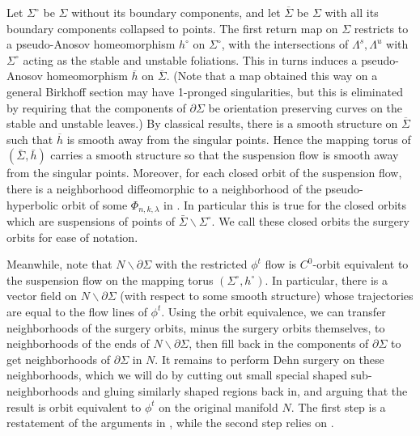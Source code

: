 \documentclass[12pt]{amsart}
\theoremstyle{definition}
\numberwithin{equation}{section}
\begin{document}
Let $\Sigma^\circ$ be $\Sigma$ without its boundary components, and let $\overline{\Sigma}$ be $\Sigma$ with all its boundary components collapsed to points. The first return map on $\Sigma$ restricts to a pseudo-Anosov homeomorphism $h^\circ$ on $\Sigma^\circ$, with the intersections of $\Lambda^s, \Lambda^u$ with $\Sigma^\circ$ acting as the stable and unstable foliations. This in turns induces a pseudo-Anosov homeomorphism $\overline{h}$ on $\overline{\Sigma}$. (Note that a map obtained this way on a general Birkhoff section may have 1-pronged singularities, but this is eliminated by requiring that the components of $\partial \Sigma$ be orientation preserving curves on the stable and unstable leaves.) By classical results, there is a smooth structure on $\overline{\Sigma}$ such that $\overline{h}$ is smooth away from the singular points. Hence the mapping torus of $(\bar{\Sigma}, \bar{h})$ carries a smooth structure so that the suspension flow is smooth away from the singular points. Moreover, for each closed orbit of the suspension flow, there is a neighborhood diffeomorphic to a neighborhood of the pseudo-hyperbolic orbit of some $\Phi_{n,k,\lambda}$ in . In particular this is true for the closed orbits which are suspensions of points of $\bar{\Sigma} \backslash \Sigma^\circ$. We call these closed orbits the surgery orbits for ease of notation.

Meanwhile, note that $N \backslash \partial \Sigma$ with the restricted $\phi^t$ flow is $C^0$-orbit equivalent to the suspension flow on the mapping torus $(\Sigma^\circ, h^\circ)$. In particular, there is a vector field on $N \backslash \partial \Sigma$ (with respect to some smooth structure) whose trajectories are equal to the flow lines of $\phi^t$. Using the orbit equivalence, we can transfer neighborhoods of the surgery orbits, minus the surgery orbits themselves, to neighborhoods of the ends of $N \backslash \partial \Sigma$, then fill back in the components of $\partial \Sigma$ to get neighborhoods of $\partial \Sigma$ in $N$. It remains to perform Dehn surgery on these neighborhoods, which we will do by cutting out small special shaped sub-neighborhoods and gluing similarly shaped regions back in, and arguing that the result is orbit equivalent to $\phi^t$ on the original manifold $N$. The first step is a restatement of the arguments in \cite{Goo83}, while the second step relies on \cite[Theorem 3.9]{Sha21}. 
\end{document}
